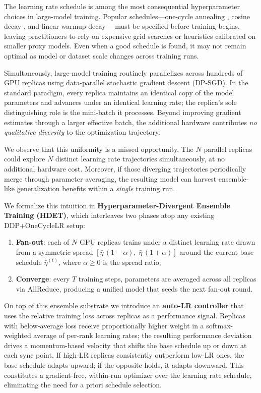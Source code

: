 \documentclass{article}
\begin{document}
The learning rate schedule is among the most consequential hyperparameter choices
in large-model training.  Popular schedules---one-cycle annealing
\citep{smith2019super}, cosine decay \citep{loshchilov2017sgdr}, and linear
warmup-decay \citep{vaswani2017attention}---must be specified before training begins,
leaving practitioners to rely on expensive grid searches or heuristics calibrated
on smaller proxy models.  Even when a good schedule is found, it may not remain
optimal as model or dataset scale changes across training runs.

Simultaneously, large-model training routinely parallelizes across hundreds of GPU
replicas using data-parallel stochastic gradient descent (DP-SGD).  In the standard
paradigm, every replica maintains an identical copy of the model parameters and
advances under an identical learning rate; the replica's sole distinguishing role is
the mini-batch it processes.  Beyond improving gradient estimates through a larger
effective batch, the additional hardware contributes \emph{no qualitative diversity}
to the optimization trajectory.

We observe that this uniformity is a missed opportunity.  The $N$ parallel replicas
could explore $N$ distinct learning rate trajectories simultaneously, at no
additional hardware cost.  Moreover, if those diverging trajectories periodically
merge through parameter averaging, the resulting model can harvest
ensemble-like generalization benefits within a \emph{single} training run.

We formalize this intuition in \textbf{Hyperparameter-Divergent Ensemble Training
(HDET)}, which interleaves two phases atop any existing DDP+OneCycleLR setup:

\begin{enumerate}
\item \textbf{Fan-out}: each of $N$ GPU replicas trains under a distinct learning
  rate drawn from a symmetric spread $[\bar\eta\,(1-\alpha),\; \bar\eta\,(1+\alpha)]$
  around the current base schedule $\bar\eta^{(t)}$, where $\alpha \geq 0$ is the
  spread ratio;
\item \textbf{Converge}: every $T$ training steps, parameters are averaged across
  all replicas via AllReduce, producing a unified model that seeds the next
  fan-out round.
\end{enumerate}

On top of this ensemble substrate we introduce an \textbf{auto-LR controller}
that uses the relative training loss across replicas as a performance signal.
Replicas with below-average loss receive proportionally higher weight in a
softmax-weighted average of per-rank learning rates; the resulting performance
deviation drives a momentum-based velocity that shifts the base schedule up or down
at each sync point.  If high-LR replicas consistently outperform low-LR ones,
the base schedule adapts upward; if the opposite holds, it adapts downward.
This constitutes a gradient-free, within-run optimizer over the learning rate
schedule, eliminating the need for a priori schedule selection.
\end{document}
